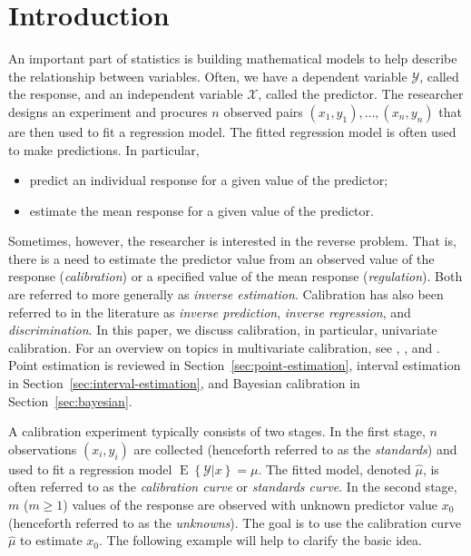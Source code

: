\documentclass[cmfont,usenames,dvipsnames,leqno]{afit-etd}\usepackage[]{graphicx}\usepackage[]{color}
\newcommand{\mc}[1]{\ensuremath{\mathcal{#1}}}
\newcommand{\wh}[1]{\ensuremath{\widehat{#1}}}
\newcommand{\E}{\operatorname{E}}
\begin{document}


\chapter{Introduction}
\label{sec:intro}
An important part of statistics is building mathematical models to help describe the relationship between variables. Often, we have a dependent variable $\mathcal{Y}$, called the response, and an independent variable $\mathcal{X}$, called the predictor. The researcher designs an experiment and procures $n$ observed pairs $(x_1, y_1), \dotsc, (x_n, y_n)$ that are then used to fit a regression model. The fitted regression model is often used to make predictions. In particular,
\begin{itemize}
  \item predict an individual response for a given value of the predictor;
  \item estimate the mean response for a given value of the predictor.
\end{itemize}
Sometimes, however, the researcher is interested in the reverse problem. That is, there is a need to estimate the predictor value from an observed value of the response (\textit{calibration}) or a specified value of the mean response (\textit{regulation}). Both are referred to more generally as \textit{inverse estimation}. Calibration has also been referred to in the literature as \textit{inverse prediction}, \textit{inverse regression}, and \textit{discrimination}. In this paper, we discuss calibration, in particular, univariate calibration. For an overview on topics in multivariate calibration, see \citet{brown_multivariate_1982}, \citet{brown_confidence_1987}, and \citet{brown_measurement_1993}. Point estimation is reviewed in Section~\ref{sec:point-estimation}, interval estimation in Section~\ref{sec:interval-estimation}, and Bayesian calibration in Section~\ref{sec:bayesian}.   

A calibration experiment typically consists of two stages. In the first stage, $n$ observations $(x_i, y_i)$ are collected (henceforth referred to as the \textit{standards}) and used to fit a regression model $\E\left\{\mc{Y} | x\right\} = \mu$. The fitted model, denoted $\wh{\mu}$, is often referred to as the \textit{calibration curve} or \textit{standards curve}. In the second stage, $m$ ($m \ge 1$) values of the response are observed with unknown predictor value $x_0$ (henceforth referred to as the \textit{unknowns}). The goal is to use the calibration curve $\wh{\mu}$ to estimate $x_0$. The following example will help to clarify the basic idea. 
\end{document}
